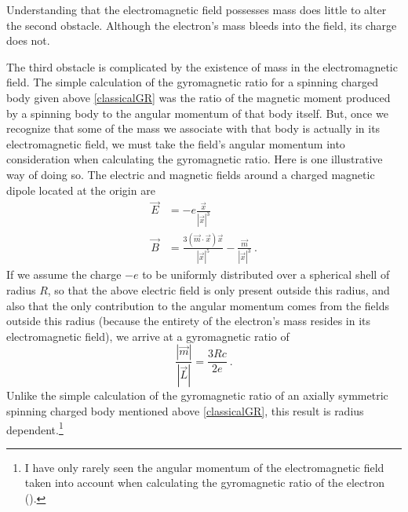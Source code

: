 \documentclass[onecolumn,secnumarabic,amsmath,amssymb,balancelastpage,nofootinbib]{article}
\begin{document}
Understanding that the electromagnetic field possesses mass does little to alter the second obstacle.  Although the electron's mass bleeds into the field, its charge does not.

The third obstacle is complicated by the existence of mass in the electromagnetic field.  The simple calculation of the gyromagnetic ratio for a spinning charged body given above \eqref{classicalGR} was the ratio of the magnetic moment produced by a spinning body to the angular momentum of that body itself.  But, once we recognize that some of the mass we associate with that body is actually in its electromagnetic field, we must take the field's angular momentum into consideration when calculating the gyromagnetic ratio.  Here is one illustrative way of doing so.  The electric and magnetic fields around a charged magnetic dipole located at the origin are
\begin{align}
\vec{E}&=-e\frac{\vec{x}}{|\vec{x}|^3}
\nonumber
\\
\vec{B}&=\frac{3 (\vec{m}\cdot\vec{x})\vec{x}}{|\vec{x}|^5}-\frac{\vec{m}}{|\vec{x}|^3}\ .
\end{align}
If we assume the charge $-e$ to be uniformly distributed over a spherical shell of radius $R$, so that the above electric field is only present outside this radius, and also that the only contribution to the angular momentum comes from the fields outside this radius (because the entirety of the electron's mass resides in its electromagnetic field), we arrive at a gyromagnetic ratio of
\begin{equation}
\frac{|\vec{m}|}{|\vec{L}|}=\frac{3 R c}{2 e}\ .
\label{fieldGR}
\end{equation}
Unlike the simple calculation of the gyromagnetic ratio of an axially symmetric spinning charged body mentioned above \eqref{classicalGR}, this result is radius dependent.\footnote{I have only rarely seen the angular momentum of the electromagnetic field taken into account when calculating the gyromagnetic ratio of the electron (\citealp{corben1961, giulini2008}).}
\end{document}
